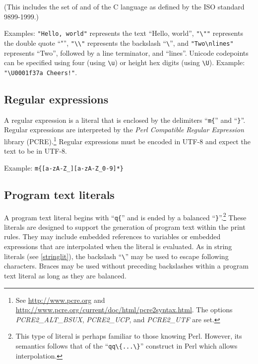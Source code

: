\bigskip

\noindent
(This includes the set of  and
 of the C language as defined
by the ISO standard 9899-1999.)

Examples: \lstinline!"Hello, world"! represents the text ``Hello, world'',
\lstinline!"\""! represents the double quote ``"'',
\lstinline!"\\"! represents the backslash ``\lstinline!\!'',
and \lstinline!"Two\nlines"! represents ``Two'', followed by
a line terminator, and ``lines''. Unicode codepoints can be
specified using four (using \lstinline!\u!) or height hex digits
(using \lstinline!\U!). Example: \lstinline^"\U0001f37a Cheers!"^.

\subsection{Regular expressions}\label{regexlit}

A regular expression is a literal that is enclosed by the
delimiters ``\lstinline!m{!'' and ``\lstinline!}!''. Regular
expressions are interpreted by the \textit{Perl Compatible
Regular Expression} library (PCRE).\footnote{See
\url{http://www.pcre.org} and
\url{http://www.pcre.org/current/doc/html/pcre2syntax.html}. The
options \textit{PCRE2\_ALT\_BSUX}, \textit{PCRE2\_UCP},
and \textit{PCRE2\_UTF} are set.} Regular expressions
must be encoded in UTF-8 and expect the text to be in UTF-8.

Example: \lstinline!m{[a-zA-Z_][a-zA-Z_0-9]*}!

\subsection{Program text literals}
\label{textlit}

A program text literal begins with ``\lstinline!q{!'' and is ended
by a balanced ``\lstinline!}!''.\footnote{This type of literal is
perhaps familiar to those knowing Perl. However, its semantics follows
that of the ``\lstinline!qq\{...\}!'' construct in Perl which allows
interpolation.} These literals are designed to support the generation of
program text within the print rules. They may include
embedded references to variables or embedded expressions that are
interpolated when the literal is evaluated. As in string literals (see
\ref{stringlit}), the backslash ``\lstinline!\!'' may be used to escape
following characters. Braces may be used without preceding backslashes
within a program text literal as long as they are balanced.

